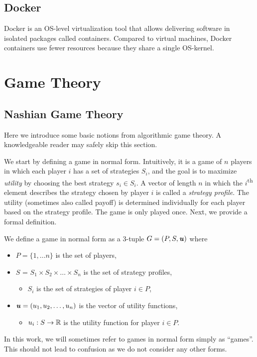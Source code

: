 \subsection{Docker}
Docker is an OS-level virtualization tool that allows delivering software in isolated packages called containers.
Compared to virtual machines, Docker containers use fewer resources because they share a single OS-kernel.


\section{Game Theory}
\subsection{Nashian Game Theory}
Here we introduce some basic notions from algorithmic game theory.
A knowledgeable reader may safely skip this section.

We start by defining a game in normal form.
Intuitively, it is a game of $n$ players in which each player $i$ has a set of strategies $S_i$, and the goal is to maximize \textit{utility} by choosing the best strategy $s_i \in S_i$.
A vector of length $n$ in which the $i$\textsuperscript{th} element describes the strategy chosen by player $i$ is called a \textit{strategy profile}.
The utility (sometimes also called payoff) is determined individually for each player based on the strategy profile.
The game is only played once.
Next, we provide a formal definition.

\begin{definition}
  We define a game in normal form as a 3-tuple $G = (P, S, \boldsymbol{\mathit{u}})$ where
  \begin{itemize}
    \item $P = \{1, \dots n\}$ is the set of players,
    \item $S$ = $S_1 \times S_2 \times \dots \times S_n$ is the set of strategy profiles,
    \begin{itemize}
      \item $S_i$ is the set of strategies of player $i \in P$,
    \end{itemize}
    \item $\boldsymbol{\mathit{u}} = (u_1, u_2, \dots, u_n)$ is the vector of utility functions,
    \begin{itemize}
      \item $u_i: S \rightarrow \mathbb{R}$ is the utility function for player $i \in P$.
    \end{itemize}
  \end{itemize}
  In this work, we will sometimes refer to games in normal form simply as \enquote{games}.
  This should not lead to confusion as we do not consider any other forms.
\end{definition}

